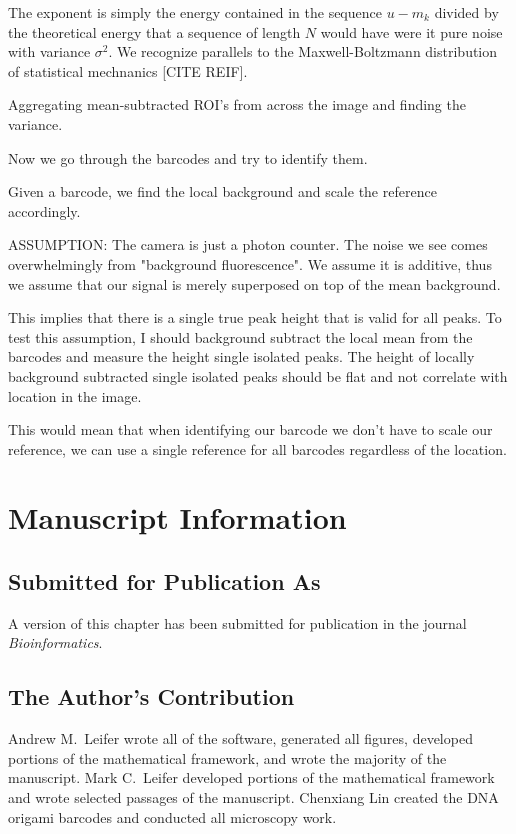 The exponent is simply the energy contained in the sequence $u-m_k$ divided by the
theoretical energy that a sequence of length $N$ would have were it pure noise with variance $\sigma^2$. We recognize parallels to the Maxwell-Boltzmann distribution of statistical
mechnanics [CITE REIF].  














Aggregating mean-subtracted ROI's from across the image and finding the variance.

Now we go through the barcodes and try to identify them.

Given a barcode, we find the local background and scale the reference accordingly. 

ASSUMPTION: The camera is just a photon counter. The noise we see comes overwhelmingly from "background fluorescence". We assume it is additive, thus we assume that our signal is merely superposed on top of the mean background. 

This implies that there is a single true peak height that is valid for all peaks. To test this assumption, I should background subtract the local mean from the barcodes and measure the height single isolated peaks. The height of locally background subtracted single isolated peaks should be flat and not correlate with location in the image.

This would mean that when identifying our barcode we don't have to scale our reference, we can use a single reference for all barcodes regardless of the location.


\section{Manuscript Information}
\subsection{Submitted for Publication As}
A version of this chapter has been submitted for publication in the journal \textit{Bioinformatics}.

\subsection{The Author's Contribution}
Andrew M.~Leifer wrote all of the software, generated all figures, developed portions of the mathematical framework, and wrote the majority of the manuscript. Mark C.~Leifer developed portions of the mathematical framework and wrote selected passages of the manuscript. Chenxiang Lin created the DNA origami barcodes and conducted all microscopy work. 
 